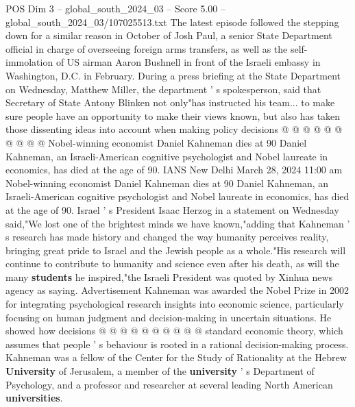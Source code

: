 \begin{textsample}{POS Dim 3 – global\_south\_2024\_03 – Score 5.00 – global\_south\_2024\_03/107025513.txt}
The latest episode followed the stepping down for a similar reason in October of Josh Paul, a senior State Department official in charge of overseeing foreign arms transfers, as well as the self-immolation of US airman Aaron Bushnell in front of the Israeli embassy in Washington, D.C. in February.
During a press briefing at the State Department on Wednesday, Matthew Miller, the department ' s spokesperson, said that Secretary of State Antony Blinken not only"has instructed his team... to make sure people have an opportunity to make their views known, but also has taken those dissenting ideas into account when making policy decisions @ @ @ @ @ @ @ @ @ @ Nobel-winning economist Daniel Kahneman dies at 90 Daniel Kahneman, an Israeli-American cognitive psychologist and Nobel laureate in economics, has died at the age of 90.
IANS New Delhi March 28, 2024 11:00 am Nobel-winning economist Daniel Kahneman dies at 90 Daniel Kahneman, an Israeli-American cognitive psychologist and Nobel laureate in economics, has died at the age of 90.
Israel ' s President Isaac Herzog in a statement on Wednesday said,"We lost one of the brightest minds we have known,"adding that Kahneman ' s research has made history and changed the way humanity perceives reality, bringing great pride to Israel and the Jewish people as a whole."His research will continue to contribute to humanity and science even after his death, as will the many \textbf{students} he inspired,"the Israeli President was quoted by Xinhua news agency as saying.
Advertisement Kahneman was awarded the Nobel Prize in 2002 for integrating psychological research insights into economic science, particularly focusing on human judgment and decision-making in uncertain situations.
He showed how decisions @ @ @ @ @ @ @ @ @ @ standard economic theory, which assumes that people ' s behaviour is rooted in a rational decision-making process.
Kahneman was a fellow of the Center for the Study of Rationality at the Hebrew \textbf{University} of Jerusalem, a member of the \textbf{university} ' s Department of Psychology, and a professor and researcher at several leading North American \textbf{universities}.

\end{textsample}

